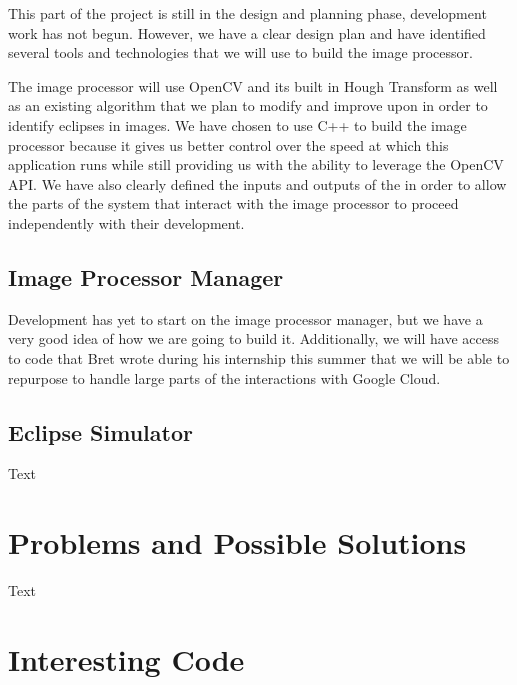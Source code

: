 \documentclass[10pt, onecolumn, draftclsnofoot, letterpaper, compsoc]{IEEEtran}
\begin{document}
This part of the project is still in the design and planning phase, development
work has not begun. However, we have a clear design plan and have identified
several tools and technologies that we will use to build the image processor.

The image processor will use OpenCV and its built in Hough Transform as well as
an existing algorithm that we plan to modify and improve upon in order to
identify eclipses in images. We have chosen to use C++ to build the image
processor because it gives us better control over the speed at which this
application runs while still providing us with the ability to leverage the
OpenCV API. We have also clearly defined the inputs and outputs of the in order
to allow the parts of the system that interact with the image processor to
proceed independently with their development.

\subsection{Image Processor Manager}

Development has yet to start on the image processor manager, but we have a very good idea of how we 
are going to build it. Additionally, we will have access to code that Bret wrote during his internship 
this summer that we will be able to repurpose to handle large parts of the interactions with Google Cloud.

\subsection{Eclipse Simulator}

Text

\section{Problems and Possible Solutions}

Text

\section{Interesting Code}
\end{document}
